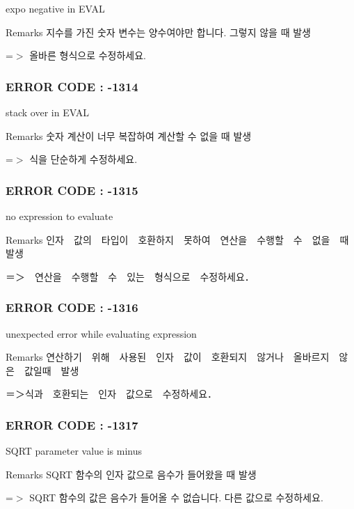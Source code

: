 expo negative in E\-V\-A\-L \begin{DoxyRemark}{Remarks}
지수를 가진 숫자 변수는 양수여야만 합니다. 그렇지 않을 때 발생 \par
 =$>$ 올바른 형식으로 수정하세요.
\end{DoxyRemark}


 \subsubsection*{E\-R\-R\-O\-R C\-O\-D\-E \-: -\/1314 }

stack over in E\-V\-A\-L \begin{DoxyRemark}{Remarks}
숫자 계산이 너무 복잡하여 계산할 수 없을 때 발생 \par
 =$>$ 식을 단순하게 수정하세요.
\end{DoxyRemark}


 \subsubsection*{E\-R\-R\-O\-R C\-O\-D\-E \-: -\/1315 }

no expression to evaluate \begin{DoxyRemark}{Remarks}
인자　값의　타입이　호환하지　못하여　연산을　수행할　수　없을　때　발생 \par
 ＝＞　연산을　수행할　수　있는　형식으로　수정하세요．
\end{DoxyRemark}


 \subsubsection*{E\-R\-R\-O\-R C\-O\-D\-E \-: -\/1316 }

unexpected error while evaluating expression \begin{DoxyRemark}{Remarks}
연산하기　위해　사용된　인자　값이　호환되지　않거나　올바르지　않은　값일때　발생 \par
 ＝＞식과　호환되는　인자　값으로　수정하세요．
\end{DoxyRemark}


 \subsubsection*{E\-R\-R\-O\-R C\-O\-D\-E \-: -\/1317 }

S\-Q\-R\-T parameter value is minus \begin{DoxyRemark}{Remarks}
S\-Q\-R\-T 함수의 인자 값으로 음수가 들어왔을 때 발생 \par
 =$>$ S\-Q\-R\-T 함수의 값은 음수가 들어올 수 없습니다. 다른 값으로 수정하세요.
\end{DoxyRemark}



